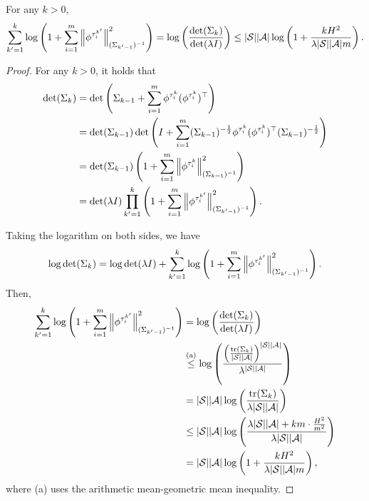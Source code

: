 \begin{lemma} \label{lemma:log_det_seg}
	For any $k>0$,
	\begin{align*}
		\sum_{k'=1}^{k} \log\left(  1+\sum_{i=1}^{m} \left\| \phi^{\tau^{k'}_i} \right\|_{(\Sigma_{k'-1})^{-1}}^2  \right) = \log \left(  \frac{\det(\Sigma_k)}{\det(\lambda I)}  \right)
		\leq |\mathcal{S}| |\mathcal{A}| \log \left(  1+ \frac{  kH^2 }{ \lambda |\mathcal{S}| |\mathcal{A}| m }  \right) .
	\end{align*}
\end{lemma}
\begin{proof}
	For any $k>0$, it holds that
	\begin{align*}
		\det(\Sigma_k)&=\det\left( \Sigma_{k-1}+ \sum_{i=1}^{m} \phi^{\tau^k_i} (\phi^{\tau^k_i})^\top \right)
		\\
		&=\det(\Sigma_{k-1}) \det\left(  I + \sum_{i=1}^{m} (\Sigma_{k-1})^{-\frac{1}{2}}   \phi^{\tau^k_i} (\phi^{\tau^k_i})^\top  (\Sigma_{k-1})^{-\frac{1}{2}}  \right)
		\\
		&=\det(\Sigma_{k-1}) \left(  1+ \sum_{i=1}^{m} \left\| \phi^{\tau^k_i} \right\|_{(\Sigma_{k-1})^{-1}}^2  \right)
		\\
		&=\det(\lambda I) \prod_{k'=1}^{k} \left(  1+ \sum_{i=1}^{m} \left\| \phi^{\tau^{k'}_i} \right\|_{(\Sigma_{k'-1})^{-1}}^2  \right) .
	\end{align*}
	
	Taking the logarithm on both sides, we have
	\begin{align*}
		\log \det(\Sigma_k) = \log \det(\lambda I) +  \sum_{k'=1}^{k} \log\left(  1+ \sum_{i=1}^{m} \left\| \phi^{\tau^{k'}_i} \right\|_{(\Sigma_{k'-1})^{-1}}^2  \right) .
	\end{align*}
	Then,
	\begin{align*}
		\sum_{k'=1}^{k} \log\left(  1+\sum_{i=1}^{m} \left\| \phi^{\tau^{k'}_i} \right\|_{(\Sigma_{k'-1})^{-1}}^2  \right) &= \log \left(  \frac{\det(\Sigma_k)}{\det(\lambda I)}  \right)
		\\
		&\overset{\textup{(a)}}{\leq} \log \left(  \frac{\left(  \frac{\textup{tr}(\Sigma_k)}{|\mathcal{S}| |\mathcal{A}|} \right)^{|\mathcal{S}| |\mathcal{A}|} }{ \lambda^{|\mathcal{S}| |\mathcal{A}|} }  \right)
		\\
		&= |\mathcal{S}| |\mathcal{A}| \log \left(  \frac{  \textup{tr}(\Sigma_k) }{ \lambda |\mathcal{S}| |\mathcal{A}| }  \right)
		\\
		&\leq |\mathcal{S}| |\mathcal{A}| \log \left(  \frac{ \lambda |\mathcal{S}| |\mathcal{A}| + km \cdot \frac{H^2}{m^2} }{ \lambda |\mathcal{S}| |\mathcal{A}| }  \right)
		\\
		&= |\mathcal{S}| |\mathcal{A}| \log \left(  1+\frac{ kH^2 }{ \lambda |\mathcal{S}| |\mathcal{A}| m }  \right) ,
	\end{align*}
	where (a) uses the arithmetic mean-geometric mean inequality.
\end{proof}


